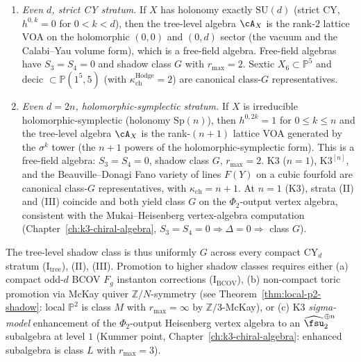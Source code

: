 \begin{theorem}
\begin{enumerate}
 triple-intersection Yukawa is retained, but the Gopakumar--Vafa
 genus-zero invariants $n^0_d$ are nonzero for every $d \geq 1$,
 driving $S_4^{\mathrm{instanton}} \neq 0$ and hence class $M$
 \textup{(}Proposition~\ref{prop:quintic-shadow-coefficients}, with
 the quintic $\kappa_{\mathrm{ch}}^{\mathrm{BCOV}} = \chi/24 = -25/3$
 separately; see Remark~\ref{rem:kappa-ch-quintic-two-views}
 below for the supertrace-vs-BCOV disambiguation\textup{)}.
 \item[\textup{(II)}] \emph{Even $d$, strict CY stratum.}
 If $X$ has holonomy exactly $\mathrm{SU}(d)$ \textup{(}strict CY,
 $h^{0, k} = 0$ for $0 < k < d$\textup{),} then the tree-level
 algebra $\cA_X$ is the rank-$2$ lattice VOA on the holomorphic
 $(0, 0)$ and $(0, d)$ sector \textup{(}the vacuum and the
 Calabi--Yau volume form\textup{),} which is a free-field algebra.
 Free-field algebras have $S_3 = S_4 = 0$ and shadow class $G$ with
 $r_{\max} = 2$. Sextic $X_6 \subset \mathbb{P}^5$ and decic
 $\subset \mathbb{P}(1^5, 5)$ \textup{(}with $\kappa_{\mathrm{ch}}^{\mathrm{Hodge}} = 2$\textup{)}
 are canonical class-$G$ representatives.
 \item[\textup{(III)}] \emph{Even $d = 2n$, holomorphic-symplectic stratum.}
 If $X$ is irreducible holomorphic-symplectic \textup{(}holonomy
 $\mathrm{Sp}(n)$\textup{),} then $h^{0, 2k} = 1$ for
 $0 \leq k \leq n$ and the tree-level algebra $\cA_X$ is the
 rank-$(n + 1)$ lattice VOA generated by the $\sigma^k$ tower
 \textup{(}the $n + 1$ powers of the holomorphic-symplectic form\textup{).}
 This is a free-field algebra: $S_3 = S_4 = 0$, shadow class $G$,
 $r_{\max} = 2$. K3 \textup{(}$n = 1$\textup{),} $\mathrm{K3}^{[n]}$,
 and the Beauville--Donagi Fano variety of lines $F(Y)$ on a cubic
 fourfold are canonical class-$G$ representatives, with
 $\kappa_{\mathrm{ch}} = n + 1$. At $n = 1$ \textup{(}K3\textup{),}
 strata \textup{(II)} and \textup{(III)} coincide and both yield
 class $G$ on the $\Phi_2$-output vertex algebra, consistent with
 the Mukai--Heisenberg vertex-algebra computation
 \textup{(}Chapter~\ref{ch:k3-chiral-algebra},
 $S_3 = S_4 = 0 \Rightarrow \Delta = 0 \Rightarrow$ class $G$\textup{).}
\end{enumerate}
The tree-level shadow class is thus uniformly $G$ across every compact
CY$_d$ stratum \textup{(}I$_{\mathrm{tree}}$\textup{), (II), (III).}
Promotion to higher shadow classes requires either
\textup{(a)} compact odd-$d$ BCOV $F_g$ instanton corrections
\textup{(I$_{\mathrm{BCOV}}$)},
\textup{(b)} non-compact toric promotion via McKay quiver
$\mathbb{Z}/N$-symmetry \textup{(}see
Theorem~\ref{thm:local-p2-shadow}: local $\mathbb{P}^2$ is class $M$
with $r_{\max} = \infty$ by $\mathbb{Z}/3$-McKay\textup{),} or
\textup{(c)} K3 \emph{sigma-model} enhancement of the $\Phi_2$-output
Heisenberg vertex algebra to an $\widehat{\fsu}_2^{\oplus n}$ subalgebra at level $1$
\textup{(}Kummer point, Chapter~\ref{ch:k3-chiral-algebra}: enhanced
subalgebra is class $L$ with $r_{\max} = 3$\textup{).}
\end{theorem}

